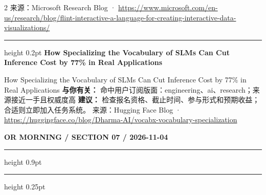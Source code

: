 \documentclass[10.5pt]{ctexart}
\begin{document}
\begin{multicols}{2}
{\footnotesize\color{ormuted} 来源：Microsoft Research Blog · \url{https://www.microsoft.com/en-us/research/blog/flint-interactive-a-language-for-creating-interactive-data-visualizations/}}
\vspace{2mm}
\hrule height 0.2pt
\vspace{2mm}
{\large\bfseries How Specializing the Vocabulary of SLMs Can Cut Inference Cost by 77\% in Real Applications}\par
How Specializing the Vocabulary of SLMs Can Cut Inference Cost by 77\% in Real Applications
\textbf{与你有关：} 命中用户订阅版面：engineering、ai、research；来源接近一手且权威度高
\textbf{建议：} 检查报名资格、截止时间、参与形式和预期收益；合适则立即加入任务系统。
{\footnotesize\color{ormuted} 来源：Hugging Face Blog · \url{https://huggingface.co/blog/Dharma-AI/vocabx-vocabulary-specialization}}
\end{multicols}
\newpage
{\small\bfseries OR MORNING / SECTION 07 / 2026-11-04}
\vspace{2mm}
\hrule height 0.9pt
\vspace{1.5mm}
\hrule height 0.25pt
\vspace{4mm}
\end{document}
